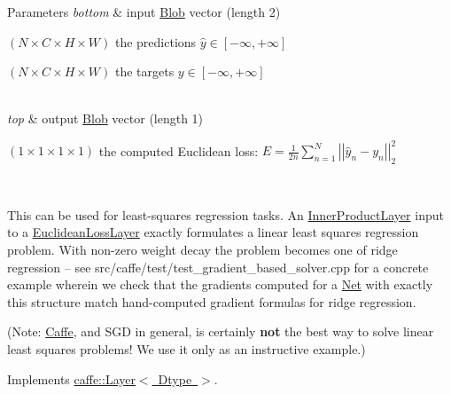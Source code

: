 \begin{DoxyParams}{Parameters}
{\em bottom} & input \mbox{\hyperlink{classcaffe_1_1_blob}{Blob}} vector (length 2)
\begin{DoxyEnumerate}
\item $ (N \times C \times H \times W) $ the predictions $ \hat{y} \in [-\infty, +\infty]$
\item $ (N \times C \times H \times W) $ the targets $ y \in [-\infty, +\infty]$ 
\end{DoxyEnumerate}\\
\hline
{\em top} & output \mbox{\hyperlink{classcaffe_1_1_blob}{Blob}} vector (length 1)
\begin{DoxyEnumerate}
\item $ (1 \times 1 \times 1 \times 1) $ the computed Euclidean loss\+: $ E = \frac{1}{2n} \sum\limits_{n=1}^N \left| \left| \hat{y}_n - y_n \right| \right|_2^2 $
\end{DoxyEnumerate}\\
\hline
\end{DoxyParams}
This can be used for least-\/squares regression tasks. An \mbox{\hyperlink{classcaffe_1_1_inner_product_layer}{Inner\+Product\+Layer}} input to a \mbox{\hyperlink{classcaffe_1_1_euclidean_loss_layer}{Euclidean\+Loss\+Layer}} exactly formulates a linear least squares regression problem. With non-\/zero weight decay the problem becomes one of ridge regression -- see src/caffe/test/test\+\_\+gradient\+\_\+based\+\_\+solver.\+cpp for a concrete example wherein we check that the gradients computed for a \mbox{\hyperlink{classcaffe_1_1_net}{Net}} with exactly this structure match hand-\/computed gradient formulas for ridge regression.

(Note\+: \mbox{\hyperlink{classcaffe_1_1_caffe}{Caffe}}, and S\+GD in general, is certainly {\bfseries not} the best way to solve linear least squares problems! We use it only as an instructive example.) 

Implements \mbox{\hyperlink{classcaffe_1_1_layer_a576ac6a60b1e99fe383831f52a6cea77}{caffe\+::\+Layer$<$ Dtype $>$}}.

\mbox{\label{classcaffe_1_1_euclidean_loss_layer_ab7f1b879898ffba67cf5035f6a56d8eb}} 
